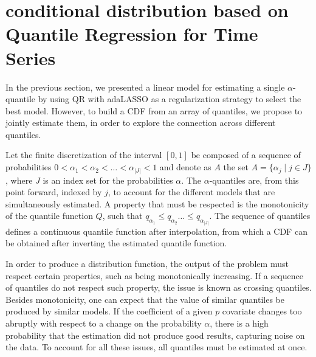 \section{conditional distribution based on Quantile Regression for Time Series}

In the previous section, we presented a linear model for estimating a single $\alpha$-quantile by using QR with adaLASSO as a regularization strategy to select the best model. However, to build a CDF from an array of quantiles, we propose to jointly estimate them, in order to explore the connection across different quantiles. 

Let the finite discretization of the interval $[0,1]$ be composed of a sequence of probabilities $0 < \alpha_1 < \alpha_2 < \dots < \alpha_{|J|} < 1$ and denote as $A$ the set $A = \{ \alpha_j \mid j \in J \}$, where $J$ is an index set for the probabilities $\alpha$. 
The $\alpha$-quantiles are, from this point forward, indexed by $j$, to account for the different models that are simultaneously estimated. A property that must be respected is the monotonicity of the quantile function $Q$, such that $q_{\alpha_1} \leq q_{\alpha_2} \dots \leq q_{\alpha_{|J|}}$.
The sequence of quantiles defines a continuous quantile function after interpolation, from which a CDF can be obtained after inverting the estimated quantile function.


In order to produce a distribution function, the output of the problem must respect certain properties, such as being monotonically increasing. 
If a sequence of quantiles do not respect such property, the issue is known as crossing quantiles.
Besides monotonicity, one can expect that the value of similar quantiles be produced by similar models. 
If the coefficient of a given $p$ covariate changes too abruptly with respect to a change on the probability $\alpha$, there is a high probability that the estimation did not produce good results, capturing noise on the data.  
To account for all these issues, all quantiles must be estimated at once. 

